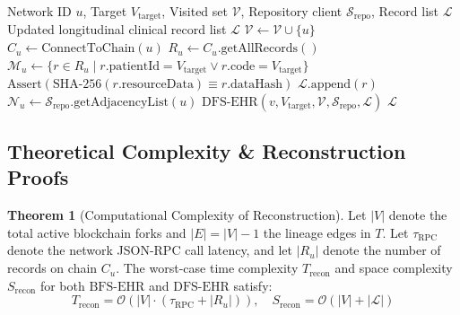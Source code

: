 \documentclass[journal]{IEEEtran}
\theoremstyle{definition}
\newtheorem{theorem}{Theorem}
\begin{document}
\begin{algorithm}[t]
\caption{Depth-First Longitudinal Search ($\text{DFS-EHR}$)}
\label{alg:dfs}
\begin{algorithmic}[1]
\Require Network ID $u$, Target $V_{\text{target}}$, Visited set $\mathcal{V}$, Repository client $\mathcal{S}_{\text{repo}}$, Record list $\mathcal{L}$
\Ensure Updated longitudinal clinical record list $\mathcal{L}$
\State $\mathcal{V} \leftarrow \mathcal{V} \cup \{u\}$
\State $C_u \leftarrow \text{ConnectToChain}(u)$
\State $R_u \leftarrow C_u.\text{getAllRecords}()$
\State $\mathcal{M}_u \leftarrow \{r \in R_u \mid r.\text{patientId} = V_{\text{target}} \lor r.\text{code} = V_{\text{target}}\}$
    \State $\text{Assert}(\text{SHA-256}(r.\text{resourceData}) \equiv r.\text{dataHash})$
    \State $\mathcal{L}.\text{append}(r)$
\EndFor
\State $\mathcal{N}_u \leftarrow \mathcal{S}_{\text{repo}}.\text{getAdjacencyList}(u)$
        \State $\text{DFS-EHR}(v, V_{\text{target}}, \mathcal{V}, \mathcal{S}_{\text{repo}}, \mathcal{L})$
    \EndIf
\EndFor
\State \Return $\mathcal{L}$
\end{algorithmic}
\end{algorithm}

\subsection{Theoretical Complexity \& Reconstruction Proofs}

\begin{theorem}[Computational Complexity of Reconstruction]
\label{thm:complexity}
Let $|V|$ denote the total active blockchain forks and $|E| = |V| - 1$ the lineage edges in $T$. Let $\tau_{\text{RPC}}$ denote the network JSON-RPC call latency, and let $|R_u|$ denote the number of records on chain $C_u$. The worst-case time complexity $T_{\text{recon}}$ and space complexity $S_{\text{recon}}$ for both $\text{BFS-EHR}$ and $\text{DFS-EHR}$ satisfy:
\begin{equation}
T_{\text{recon}} = \mathcal{O}\left(|V| \cdot (\tau_{\text{RPC}} + |R_u|)\right), \quad S_{\text{recon}} = \mathcal{O}\left(|V| + |\mathcal{L}|\right)
\end{equation}
\end{theorem}
\end{document}
